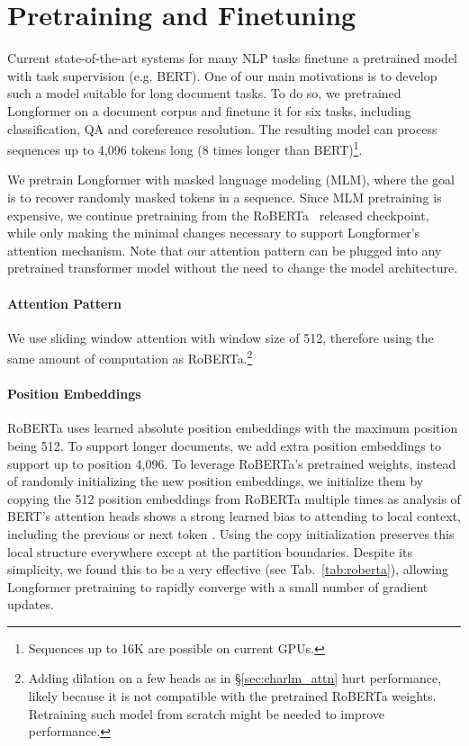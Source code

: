 \section{Pretraining and Finetuning}
\label{sec:pretrain}

Current state-of-the-art systems for many NLP tasks finetune a pretrained model with task supervision (e.g. BERT). One of our main motivations is to develop such a model suitable for long document tasks. To do so, we pretrained Longformer on a document corpus and finetune it for six tasks, including classification, QA and coreference resolution. The resulting model can process sequences up to 4,096 tokens long (8 times longer than BERT)\footnote{Sequences up to 16K are possible on current GPUs.}.

We pretrain Longformer with masked language modeling (MLM), where the goal is to recover randomly masked tokens in a sequence. Since MLM pretraining is expensive, we continue pretraining from the RoBERTa~\cite{roberta} released checkpoint, while only making the minimal changes necessary to support Longformer's attention mechanism. Note that our attention pattern can be plugged into any pretrained transformer model without the need to change the model architecture. 

\paragraph{Attention Pattern}

We use sliding window attention with window size of 512, therefore using the same amount of computation as RoBERTa.\footnote{Adding dilation on a few heads as in \S\ref{sec:charlm_attn} hurt performance, likely because it is not compatible with the pretrained RoBERTa weights. Retraining such model from scratch might be needed to improve performance.

}

\paragraph{Position Embeddings} RoBERTa uses learned absolute position embeddings with the maximum position being 512. To support longer documents, we add extra position embeddings to support up to position 4,096. To leverage RoBERTa's pretrained weights, instead of randomly initializing the new position embeddings, we initialize them by copying the 512 position embeddings from RoBERTa multiple times as analysis of BERT's attention heads shows a strong learned bias to attending to local context, including the previous or next token \cite{Clark2019WhatDB}.  Using the copy initialization preserves this local structure everywhere except at the partition boundaries. Despite its simplicity, we found this to be a very effective (see Tab.~\ref{tab:roberta}), allowing Longformer pretraining to rapidly converge with a small number of gradient updates.

